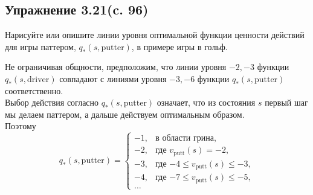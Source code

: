 \subsection{Упражнение 3.21(c. 96)}
Нарисуйте или опишите линии уровня оптимальной функции
ценности действий для игры паттером, $q_*(s,\text{putter})$, в примере игры в гольф.
\begin{solution}
    Не ограничивая общности, предположим, что линии уровня $-2, -3$ функции $q_*(s, \text{driver})$ совпадают  с линиями уровня $-3, -6$ функции $q_*(s, \text{putter})$ соответственно. \\
    Выбор действия согласно $q_*(s,\text{putter})$ означает, что из состояния $s$ первый шаг мы делаем паттером, а дальше действуем оптимальным образом. \\
    Поэтому 
    \[
    q_*(s,\text{putter}) =
    \begin{cases}
    -1, & \text{в области грина}, \\
    -2, & \text{где $v_{\text{putt}}(s)=-2$}, \\
    -3, & \text{где $-4 \le v_{\text{putt}}(s) \le -3$}, \\
    -4, & \text{где $-7 \le v_{\text{putt}}(s) \le -5$}, \\
    \dots
    \end{cases}
    \]
\end{solution}

